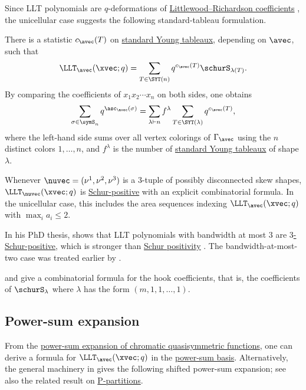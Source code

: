 Since LLT polynomials are $q$-deformations of
\hyperref[schurLittlewoodRichardson]{Littlewood--Richardson coefficients}
\cite{LeclercThibon2000}, the unicellular case suggests the following
standard-tableau formulation.

\begin{conjecture}
There is a statistic $c_\avec(T)$ on
\hyperref[prelimTableaux]{standard Young tableaux}, depending on $\avec$, such
that
\[
\LLT_{\avec}(\xvec;q)
=
\sum_{T\in\SYT(n)}q^{c_\avec(T)}\schurS_{\lambda(T)}.
\]
By comparing the coefficients of $x_1x_2\dotsm x_n$ on both sides, one obtains
\[
\sum_{\sigma\in\symS_n} q^{\asc_\avec(\sigma)}
=
\sum_{\lambda\vdash n}f^\lambda
\sum_{T\in\SYT(\lambda)}q^{c_\avec(T)},
\]
where the left-hand side sums over all vertex colorings of $\Gamma_\avec$
using the $n$ distinct colors $1,\dotsc,n$, and $f^\lambda$ is the number of
\hyperref[prelimTableaux]{standard Young tableaux} of shape $\lambda$.
\end{conjecture}

\begin{theorem}
Whenever $\nuvec=(\nu^1,\nu^2,\nu^3)$ is a $3$-tuple of possibly disconnected
skew shapes, $\LLT_{\nuvec}(\xvec;q)$ is
\hyperref[schurPositivity]{Schur-positive} with an explicit combinatorial
formula.  In the unicellular case, this includes the area
sequences indexing $\LLT_{\avec}(\xvec;q)$ with $\max_i a_i\leq 2$.
\end{theorem}

In his PhD thesis,  shows that LLT polynomials with
bandwidth at most $3$ are \hyperref[kSchur]{$3$-Schur-positive}, which is
stronger than \hyperref[schurPositivity]{Schur positivity} \cite{Miller2019}.
The bandwidth-at-most-two case was treated earlier by
 \cite{Lee2020}.

 and  give a combinatorial formula for the
hook coefficients, that is, the coefficients of $\schurS_{\lambda}$ where
$\lambda$ has the form $(m,1,1,\dotsc,1)$.


\subsection[unicellularLLTPExpansion]{Power-sum expansion}

From the \hyperref[chromaticQuasisymmetricPowerSumExpansion]{power-sum
expansion of chromatic quasisymmetric functions}, one can derive a formula for
$\LLT_\avec(\xvec;q)$ in the \hyperref[powerSum]{power-sum basis}.
Alternatively, the general
machinery in \cite{AlexanderssonSulzgruber2019} gives the following shifted
power-sum expansion; see also the related result on
\hyperref[pPartitionPsiExp]{P-partitions}.

